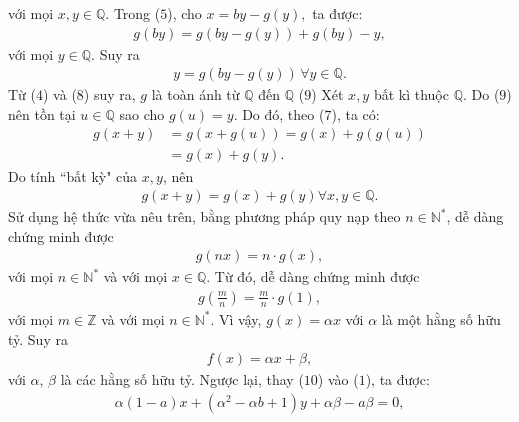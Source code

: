\begin{multicols}{2}
	với mọi $x,y \in \mathbb{Q}$.
	\vskip 0.05cm
	Trong ($5$), cho $x = by - g\left( y \right),$  ta được:
	\begin{align*}
		g\left( {by} \right) = g\left( {by - g\left( y \right)} \right) + g\left( {by} \right) - y,
	\end{align*}
	với mọi $y \in \mathbb{Q}$. Suy ra
	\begin{align*}
		y = g\left( {by - g\left( y \right)} \right)\,\forall y \in \mathbb{Q}. \tag{$8$}
	\end{align*}
	Từ ($4$) và ($8$) suy ra, $g$ là toàn ánh từ $\mathbb{Q}$ \linebreak đến  $\mathbb{Q}$ \hfill ($9$)
	\vskip 0.05cm
	Xét $x, y$ bất kì thuộc $\mathbb{Q}$.
	\vskip 0.05cm  
	Do ($9$) nên tồn tại $u \in \mathbb{Q}$  sao cho $g(u) = y$. Do đó, theo ($7$), ta có:
	\begin{align*}
		g\left( {x + y} \right) &= g\left( {x + g\left( u \right)} \right) = g\left( x \right) + g\left( {g\left( u \right)} \right) \\
		&= g\left( x \right) + g\left( y \right).
	\end{align*}
	Do tính ``bất kỳ" của $x, y$, nên
	\begin{align*}
		g\left( {x + y} \right) = g\left( x \right) + g\left( y \right)\forall x,y \in \mathbb{Q}.
	\end{align*}
	Sử dụng hệ thức vừa nêu trên, bằng phương pháp quy nạp theo $n \in \mathbb{N^*}$, dễ dàng chứng minh được
	\begin{align*}
		g\left( {nx} \right) = n \cdot g\left( x \right),
	\end{align*}
	với mọi $n \in \mathbb{N^*}$  và với mọi  $x \in \mathbb{Q}$.
	\vskip 0.05cm
	Từ đó, dễ dàng chứng minh được
	\begin{align*}
		g\left( {\frac{m}{n}} \right) = \frac{m}{n} \cdot g\left( 1 \right),
	\end{align*}
	với mọi $m \in \mathbb{Z}$  và với mọi $n \in \mathbb{N^*}$.
	\vskip 0.05cm 
	Vì vậy, $g(x) = \alpha x$  với $\alpha$  là một hằng số hữu tỷ.
	\vskip 0.05cm
	Suy ra
	\begin{align*}
		f\left( x \right) = \alpha x + \beta , \tag{$10$}
	\end{align*}     
	với $\alpha$, $\beta$  là các hằng số hữu tỷ.
	\vskip 0.05cm
	Ngược lại, thay ($10$) vào ($1$), ta được:
	\begin{align*}
		\alpha \left(\! {1 \!-\! a} \!\right)x \!+\! \left(\! {{\alpha ^2} \!-\! \alpha b \!+\! 1} \right)y \!+\! \alpha \beta  \!-\! a\beta  \!=\! 0, 

\end{align*}
\end{multicols}

